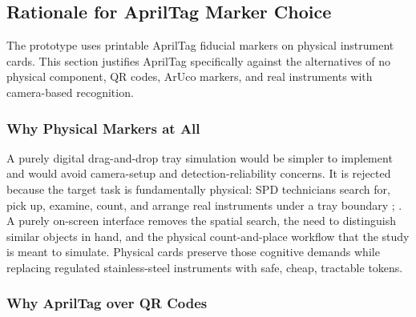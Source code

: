 \documentclass[10pt,a4paper]{article}
\begin{document}
\subsection{Rationale for AprilTag Marker Choice}

The prototype uses printable AprilTag fiducial markers on physical instrument
cards. This section justifies AprilTag specifically against the alternatives of
no physical component, QR codes, ArUco markers, and real instruments with
camera-based recognition.
\subsubsection{Why Physical Markers at All}

A purely digital drag-and-drop tray simulation would be simpler to implement
and would avoid camera-setup and detection-reliability concerns. It is rejected
because the target task is fundamentally physical: SPD technicians search for,
pick up, examine, count, and arrange real instruments under a tray boundary
\cite{nichol-et-al-2024};
\cite{alfred-et-al-2021}. A purely on-screen
interface removes the spatial search, the need to distinguish similar objects
in hand, and the physical count-and-place workflow that the study is meant to
simulate. Physical cards preserve those cognitive demands while replacing
regulated stainless-steel instruments with safe, cheap, tractable tokens.
\subsubsection{Why AprilTag over QR Codes}
\end{document}
